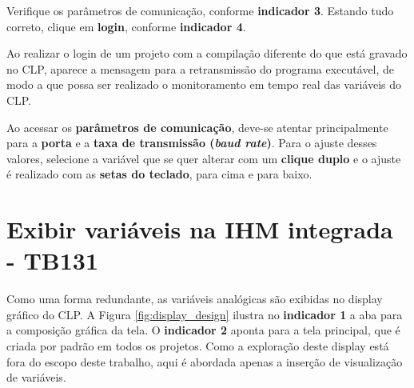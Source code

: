 Verifique os parâmetros de comunicação, 
conforme \textbf{indicador 3}.
Estando tudo correto, clique em \textbf{login}, conforme \textbf{indicador 4}. 


\begin{figure}[ht!]
	\centering
\end{figure}


Ao realizar o login de um projeto com a compilação diferente do que está gravado no CLP, 
aparece a mensagem para a retransmissão do programa executável, 
de modo a que possa ser realizado o monitoramento em tempo real das variáveis do CLP.


Ao acessar os \textbf{parâmetros de comunicação}, 
deve-se atentar principalmente para a \textbf{porta} e a \textbf{taxa de transmissão (\textit{baud rate})}. 
Para o ajuste desses valores, selecione a variável que se quer alterar com um \textbf{clique duplo} e o ajuste é realizado com as \textbf{setas do teclado}, para cima e para baixo.



\section{Exibir variáveis na IHM integrada - TB131}


Como uma forma redundante, 
as variáveis analógicas são exibidas no display gráfico do CLP. 
A Figura \ref{fig:display_design} ilustra no \textbf{indicador 1} a aba para a composição gráfica da tela. 
O \textbf{indicador 2} aponta para a tela principal, 
que é criada por padrão em todos os projetos. 
Como a exploração deste display está fora do escopo deste trabalho, 
aqui é abordada apenas a inserção de visualização de variáveis. 


